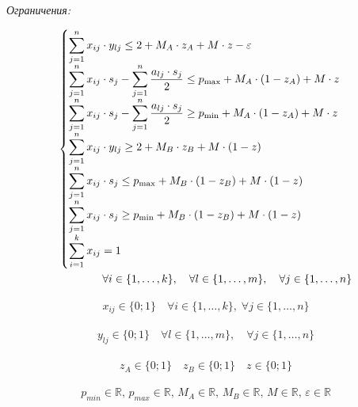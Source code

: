\documentclass[14pt,fleqn]{extarticle}
\begin{document}
	\textit{Ограничения:}
	\begin{ceqn}
		\begin{align*}
			\begin{cases}
				\smashoperator[r]{\sum_{j=1}^{n}} x_{ij} \cdot y_{lj} \leq 2 + M_A \cdot z_A + M \cdot z - \varepsilon\\
				\smashoperator[r]{\sum_{j=1}^{n}} x_{ij} \cdot s_j - \smashoperator[r]{\sum_{j=1}^{n}} \dfrac{a_{lj} \cdot s_j}{2} \leq p_{\max} +  M_A \cdot (1 - z_A) + M \cdot z\\
				\smashoperator[r]{\sum_{j=1}^{n}} x_{ij} \cdot s_j - \smashoperator[r]{\sum_{j=1}^{n}} \dfrac{a_{lj} \cdot s_j}{2} \geq p_{\min} +  M_A \cdot (1 - z_A) + M \cdot z\\
				\smashoperator[r]{\sum_{j=1}^{n}} x_{ij} \cdot y_{lj} \geq 2 + M_B \cdot z_B + M \cdot (1-z)\\
				\smashoperator[r]{\sum_{j=1}^{n}} x_{ij} \cdot s_j \leq p_{\max} +  M_B \cdot (1 - z_B) + M \cdot (1-z)\\
				\smashoperator[r]{\sum_{j=1}^{n}} x_{ij} \cdot s_j \geq p_{\min} + M_B \cdot (1 - z_B) + M \cdot (1-z)\\
				\smashoperator[r]{\sum_{i=1}^{k}} x_{ij} = 1
			\end{cases}\\
			\forall i \in \{1, \dots, k\}, \quad \forall l \in \{1, \dots, m\}, \quad \forall j \in \{1, \dots, n\}
		\end{align*}
	\end{ceqn}

	\begin{ceqn}
		\begin{align*}
			x_{ij} \in \{0;1\} \quad \forall i \in \{1, \dots, k\}, \; \forall j \in \{1, \dots, n\}
		\end{align*}
	\end{ceqn}

	\begin{ceqn}
	\begin{align*}
		y_{lj} \in \{0;1\} \quad \forall l \in \{1, \dots, m\}, \quad \forall j \in \{1, \dots, n\}
	\end{align*}
	\end{ceqn}

	\begin{ceqn}
	\begin{align*}
		z_A \in \{0;1\} \quad z_B \in \{0;1\} \quad z \in \{0;1\}
	\end{align*}
	\end{ceqn}

	\begin{ceqn}
	\begin{align*}
		p_{min} \in \mathbb{R}, \, p_{max} \in \mathbb{R}, \, M_A \in \mathbb{R}, \, M_B \in \mathbb{R}, \, M \in \mathbb{R}, \, \varepsilon \in \mathbb{R}
	\end{align*}
	\end{ceqn}
\end{document}
